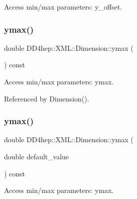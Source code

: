 Access min/max parameters\+: y\+\_\+offset. 

\hypertarget{struct_d_d4hep_1_1_x_m_l_1_1_dimension_a48dfd737c45a6fd50b0b4e758bd86dbf}{}\label{struct_d_d4hep_1_1_x_m_l_1_1_dimension_a48dfd737c45a6fd50b0b4e758bd86dbf} 
\subsubsection{\texorpdfstring{ymax()}{ymax()}\hspace{0.1cm}{\footnotesize\ttfamily [1/2]}}
{\footnotesize\ttfamily double D\+D4hep\+::\+X\+M\+L\+::\+Dimension\+::ymax (\begin{DoxyParamCaption}{ }\end{DoxyParamCaption}) const}



Access min/max parameters\+: ymax. 



Referenced by Dimension().

\hypertarget{struct_d_d4hep_1_1_x_m_l_1_1_dimension_a617f306544c5e8b366f1d417649a457e}{}\label{struct_d_d4hep_1_1_x_m_l_1_1_dimension_a617f306544c5e8b366f1d417649a457e} 
\subsubsection{\texorpdfstring{ymax()}{ymax()}\hspace{0.1cm}{\footnotesize\ttfamily [2/2]}}
{\footnotesize\ttfamily double D\+D4hep\+::\+X\+M\+L\+::\+Dimension\+::ymax (\begin{DoxyParamCaption}\item[{double}]{default\+\_\+value }\end{DoxyParamCaption}) const}



Access min/max parameters\+: ymax. 

\hypertarget{struct_d_d4hep_1_1_x_m_l_1_1_dimension_a4b510b61553ae94f7a3b731c18c87f99}{}\label{struct_d_d4hep_1_1_x_m_l_1_1_dimension_a4b510b61553ae94f7a3b731c18c87f99} 

